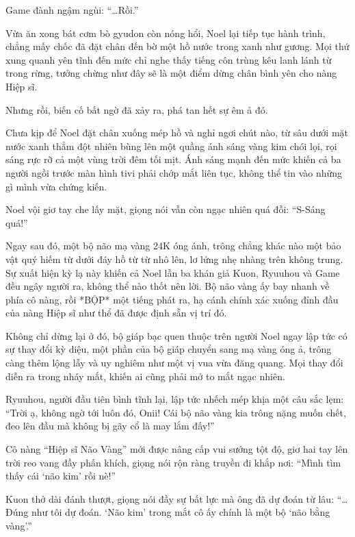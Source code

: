 \documentclass[../main.tex]{subfiles}
\begin{document}
Game đành ngậm ngùi: ``\dots Rồi.''

\ct

Vừa ăn xong bát cơm bò gyudon còn nóng hổi, Noel lại tiếp tục hành trình, chẳng mấy chốc đã đặt chân đến bờ một hồ nước trong xanh như gương. Mọi thứ xung quanh yên tĩnh đến mức chỉ nghe thấy tiếng côn trùng kêu lanh lánh từ trong rừng, tưởng chừng như đây sẽ là một điểm dừng chân bình yên cho nàng Hiệp sĩ.


Nhưng rồi, biến cố bất ngờ đã xảy ra, phá tan hết sự êm ả đó.

Chưa kịp để Noel đặt chân xuống mép hồ và nghỉ ngơi chút nào, từ sâu dưới mặt nước xanh thẳm đột nhiên bùng lên một quầng ánh sáng vàng kim chói lọi, rọi sáng rực rỡ cả một vùng trời đêm tối mịt. Ánh sáng mạnh đến mức khiến cả ba người ngồi trước màn hình tivi phải chớp mắt liên tục, không thể tin vào những gì mình vừa chứng kiến.

Noel vội giơ tay che lấy mặt, giọng nói vẫn còn ngạc nhiên quá đỗi: ``S-Sáng quá!''

Ngay sau đó, một bộ não mạ vàng 24K óng ánh, trông chẳng khác nào một bảo vật quý hiếm từ dưới đáy hồ từ từ nhô lên, lơ lửng nhẹ nhàng trên không trung. Sự xuất hiện kỳ lạ này khiến cả Noel lẫn ba khán giả Kuon, Ryuuhou và Game đều ngây người ra, không thể nào thốt nên lời. Bộ não vàng ấy bay nhanh về phía cô nàng, rồi *BỘP* một tiếng phát ra, hạ cánh chính xác xuống đỉnh đầu của nàng Hiệp sĩ như thể đã được định sẵn vị trí đó.

Không chỉ dừng lại ở đó, bộ giáp bạc quen thuộc trên người Noel ngay lập tức có sự thay đổi kỳ diệu, một phần của bộ giáp chuyển sang mạ vàng óng ả, trông càng thêm lộng lẫy và uy nghiêm như một vị vua vừa đăng quang. Mọi thay đổi diễn ra trong nháy mắt, khiến ai cũng phải mở to mắt ngạc nhiên.


Ryuuhou, người đầu tiên bình tĩnh lại, lập tức nhếch mép khịa một câu sắc lẹm: ``Trời ạ, không ngờ tới luôn đó, Onii! Cái bộ não vàng kia trông nặng muốn chết, đeo lên đầu mà không bị gãy cổ là may lắm đấy!''

Cô nàng ``Hiệp sĩ Não Vàng'' mới được nâng cấp vui sướng tột độ, giơ hai tay lên trời reo vang đầy phấn khích, giọng nói rộn ràng truyền đi khắp nơi: ``Mình tìm thấy cái `não kim' rồi nè!''

Kuon thở dài đánh thượt, giọng nói đầy sự bất lực mà ông đã dự đoán từ lâu: ``\dots Đúng như tôi dự đoán. `Não kim' trong mắt cô ấy chính là một bộ `não bằng vàng'.''
\end{document}
